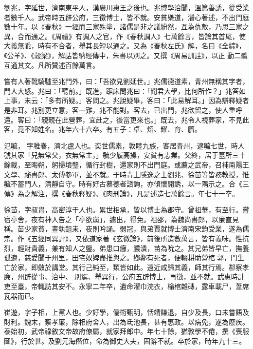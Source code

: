 \begin{pinyinscope}
 劉兆，字延世，濟南東平人，漢廣川惠王之後也。兆博學洽聞，溫篤善誘，從受業者數千人。武帝時五辟公府，三徵博士，皆不就。安貧樂道，潛心著述，不出門庭數十年。以《春秋》一經而三家殊塗，諸儒是非之議紛然，互為仇敵，乃思三家之異，合而通之。《周禮》有調人之官，作《春秋調人》七萬餘言，皆論其首尾，使大義無乖，時有不合者，舉其長短以通之。又為《春秋左氏》解，名曰《全綜》，《公羊》、《穀梁》，解詁皆納經傳中，朱書以別之。又撰《周易訓註》，以正
 動二體互通其文。凡所贊述百餘萬言。



 嘗有人著靴騎驢至兆門外，曰：「吾欲見劉延世。」兆儒德道素，青州無稱其字者，門人大怒。兆曰：「聽前。」既進，踞床問兆曰：「聞君大學，比何所作？」兆答如上事，末云：「多有所疑。」客問之。兆說疑畢，客曰：「此易解耳。」因為辯釋疑者是非耳。兆別更立意，客一難，兆不能對。客去，已出門，兆欲留之，使人重呼還。客曰：「親親在此營葬，宜赴之，後當更來也。」既去，兆令人視葬家，不見此客，竟不知姓名。兆年六十六卒。有五子：卓、炤、耀、育、臍。



 氾毓，
 字稚春，濟北盧人也。奕世儒素，敦睦九族，客居青州，逮毓七世，時人號其家「兒無常父，衣無常主，」毓少履高操，安貧有志業。父終，居于墓所三十餘載，至晦朔，躬掃墳壟，循行封樹，還家則不出門庭。或薦之武帝，召補南陽王文學、祕書郎、太傅參軍，並不就。于時青土隱逸之士劉兆、徐苗等皆務教授，惟毓不蓄門人，清靜自守。時有好古慕德者諮詢，亦傾懷開誘，以一隅示之。合《三傳》為之解注，撰《春秋釋疑》、《肉刑論》，凡是述造七萬餘言。年七十一卒。



 徐苗，字叔胄，高密淳于人也。累世相承，皆以博士為郡守。曾祖華，有至行。嘗宿亭舍，夜有神人告之「亭欲崩」，遽出，得免。祖邵，為魏尚書郎，以廉直見稱。苗少家貧，晝執鉏耒，夜則吟誦。弱冠，與弟賈就博士濟南宋鈞受業，遂為儒宗。作《五經同異評》，又依道家著《玄微論》，前後所造數萬言，皆有義味。性抗烈，輕財貴義，兼有知人之鑒。弟患口癰，膿潰，苗為吮之。其兄弟皆早亡，撫養孤遺，慈愛聞于州里，田宅奴婢盡推與之。鄉鄰有死者，便輟耕助營棺郭，門生亡於家，即斂於講堂。其行己純至，類皆如此。遠近咸歸其義，師其行焉。郡察孝廉，州辟從事、治中、
 別駕、舉異行，公府五辟博士，再徵，並不就。武惠時計吏至臺，帝輒訪其安不。永寧二年卒，遺命濯巾浣衣，榆棺雜磚，露車載尸，葦席瓦器而已。



 崔遊，字子相，上黨人也。少好學，儒術甄明，恬靖謙退，自少及長，口未嘗語及財利。魏末，察孝廉，除相府舍人，出為氐池長，甚有惠政。以病免，遂為廢疾。泰始初，武帝祿敘文帝故府僚屬，就家拜郎中。年七十餘，猶敦學不倦，撰《喪服圖》，行於世。及劉元海僭位，命為御史大夫，固辭不就。卒於家，時年九十三。




\end{pinyinscope}
